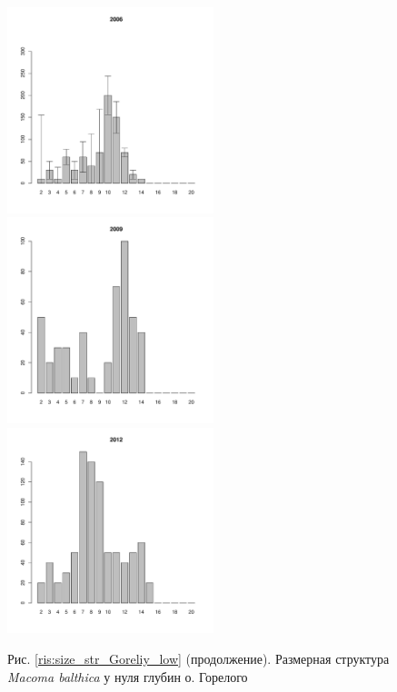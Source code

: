 \begin{figure}[hp]
\begin{minipage}[b]{.3\linewidth}
\begin{center}
	\end{center}
	\end{minipage}
	\begin{minipage}[b]{.3\linewidth}
	\begin{center}
	\includegraphics[width=60mm]{../White_Sea/Luvenga_Goreliy/low2_2006_.pdf}
	\end{center}
	\end{minipage}
	\hfill
	\begin{minipage}[b]{.3\linewidth}
	\begin{center}
	\includegraphics[width=60mm]{../White_Sea/Luvenga_Goreliy/low2_2009_.pdf}
	\end{center}
	\end{minipage}
	\hfill
	\begin{minipage}[b]{.3\linewidth}
	\begin{center}
	\includegraphics[width=60mm]{../White_Sea/Luvenga_Goreliy/low2_2012_.pdf}
	\end{center}
	\end{minipage}
\begin{center}
Рис. \ref{ris:size_str_Goreliy_low} (продолжение). Размерная структура {\it Macoma balthica} у нуля глубин  о. Горелого
\end{center}
\end{figure}



